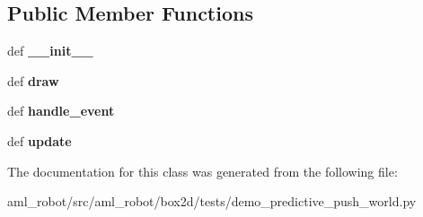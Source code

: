 \subsection*{Public Member Functions}
\begin{DoxyCompactItemize}
\item 
\hypertarget{classdemo__predictive__push__world_1_1_test_model_push_world_aa7d95b6786a7b383a7052fc03ba105fd}{def {\bfseries \-\_\-\-\_\-init\-\_\-\-\_\-}}\label{classdemo__predictive__push__world_1_1_test_model_push_world_aa7d95b6786a7b383a7052fc03ba105fd}

\item 
\hypertarget{classdemo__predictive__push__world_1_1_test_model_push_world_a9e6decdaa66774ab1cbca21365f61772}{def {\bfseries draw}}\label{classdemo__predictive__push__world_1_1_test_model_push_world_a9e6decdaa66774ab1cbca21365f61772}

\item 
\hypertarget{classdemo__predictive__push__world_1_1_test_model_push_world_a1d057184f4a573f3b7f3d64eaccf1d81}{def {\bfseries handle\-\_\-event}}\label{classdemo__predictive__push__world_1_1_test_model_push_world_a1d057184f4a573f3b7f3d64eaccf1d81}

\item 
\hypertarget{classdemo__predictive__push__world_1_1_test_model_push_world_a10231efa1728d9542842f132f3e56ba2}{def {\bfseries update}}\label{classdemo__predictive__push__world_1_1_test_model_push_world_a10231efa1728d9542842f132f3e56ba2}

\end{DoxyCompactItemize}


The documentation for this class was generated from the following file\-:\begin{DoxyCompactItemize}
\item 
aml\-\_\-robot/src/aml\-\_\-robot/box2d/tests/demo\-\_\-predictive\-\_\-push\-\_\-world.\-py\end{DoxyCompactItemize}
